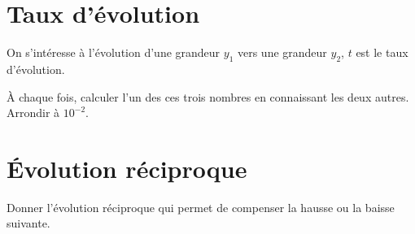 \newpage

\section{Taux d'évolution}
On s'intéresse à l'évolution d'une grandeur $y_1$ vers une grandeur $y_2$, $t$ est le taux d'évolution.

\`A chaque fois, calculer l'un des ces trois nombres en connaissant les deux autres.
Arrondir à $10^{-2}$.

\begin{questions}
	\question[2] 
\end{questions}


\section{\'Evolution réciproque}

Donner l'évolution réciproque qui permet de compenser la hausse  ou la baisse suivante.

\begin{questions}
	\question[2] 
\end{questions}
